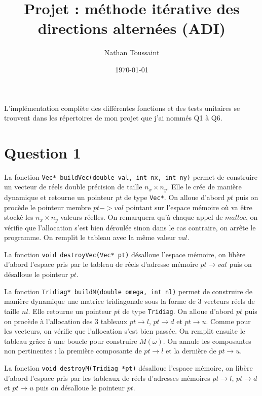 \documentclass{article}
\begin{document}
 \title{Projet : méthode itérative des directions alternées (ADI)}

\author{Nathan Toussaint }
\date{\today}
 
 \maketitle
 
L'implémentation complète des différentes fonctions et des tests unitaires se trouvent dans les répertoires
de mon projet que j'ai nommés Q1 à Q6.

\section {Question 1}

La fonction {\tt Vec* buildVec(double val, int nx, int ny)} permet de construire un vecteur de réels double précision
de taille $n_x \times n_y$. Elle le crée de manière dynamique et retourne un pointeur $pt$ de type {\tt Vec*}.
On alloue d'abord $pt$ puis on procède le pointeur membre $pt->val$ pointant sur l'espace mémoire
où va être stocké les $n_x \times n_y$ valeurs réelles. On remarquera qu'à chaque appel de $malloc$,
on vérifie que l'allocation s'est bien déroulée sinon dans le cas contraire, on arrête le programme.
On remplit le tableau avec la même valeur $val$.

La fonction {\tt void destroyVec(Vec* pt)} désalloue l'espace mémoire, on libère d'abord l'espace pris
par le tableau de réels d'adresse mémoire $pt \rightarrow val$ puis on désalloue le pointeur $pt$.

La fonction {\tt Tridiag* buildM(double omega, int nl)} permet de construire de manière dynamique une matrice tridiagonale sous la forme de 3 vecteurs réels de taille $nl$. Elle retourne un pointeur $pt$ de type {\tt *Tridiag}.
On alloue d'abord $pt$ puis on procède à l'allocation des 3 tableaux $pt \rightarrow l$, $pt \rightarrow d$ et $pt \rightarrow u$.
Comme pour les vecteurs, on vérifie que l'allocation s'est bien passée.
On remplit ensuite le tableau grâce à une boucle pour construire $M(\omega)$. On annule les
composantes non pertinentes : la première composante de $pt \rightarrow l$ et la dernière de $pt \rightarrow u$.

La fonction {\tt void destroyM(Tridiag *pt)} désalloue l'espace mémoire, on libère d'abord l'espace pris
par les tableaux de réels d'adresses mémoires $pt \rightarrow l$, $pt \rightarrow d$ et $pt \rightarrow u$ puis on désalloue le pointeur $pt$.
\end{document}
